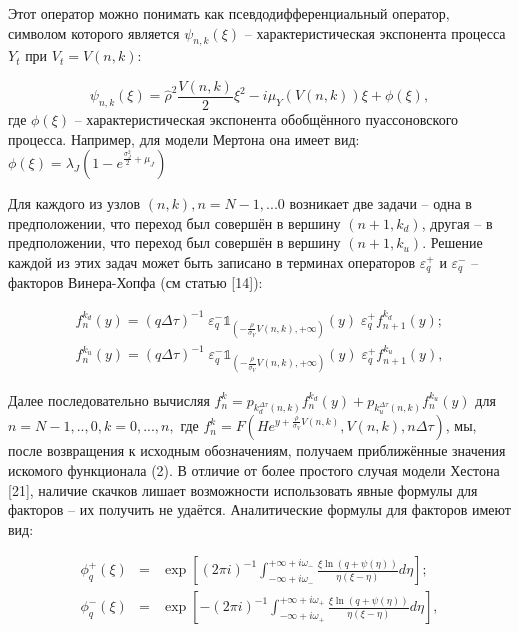 \documentclass[draft, 12pt]{article}
\begin{document}
Этот оператор можно понимать как псевдодифференциальный оператор, символом которого является $\psi_{n,k}(\xi)$ -- характеристическая экспонента процесса $Y_t$ при $V_t = V(n,k)$:

\begin{equation*}
	\psi_{n,k}(\xi) = \hat{\rho}^2\frac{V(n,k)}{2}\xi^2 - i\mu_Y(V(n,k))\xi + \phi(\xi),
\end{equation*}
где $\phi(\xi)$ -- характеристическая экспонента обобщённого пуассоновского процесса. Например, для модели Мертона она имеет вид: $\phi(\xi) = \lambda_J(1-e^{\frac{\sigma_J^2}{2} + \mu_J})$

Для каждого из узлов $(n,k), n=N-1,...0$ возникает две задачи -- одна в предположении, что переход был совершён в вершину $(n+1,k_d)$, другая -- в предположении, что переход был совершён в вершину $(n+1,k_u)$. Решение каждой из этих задач может быть записано в терминах операторов $\varepsilon^{+}_{q}$ и $\varepsilon^{-}_{q}$ -- факторов Винера-Хопфа (см статью [14]):

\begin{eqnarray*}
f_{n}^{k_{d}}(y) = (q{\Delta \tau})^{-1} \; \varepsilon^{-}_{q} \mathds{1}_{(- \frac{\rho}{\sigma_V}V(n,k), +\infty)}(y) \; \varepsilon^{+}_{q} f_{n+1}^{k_d}(y);\\
f_{n}^{k_{u}}(y) = (q{\Delta \tau})^{-1} \; \varepsilon^{-}_{q} \mathds{1}_{(- \frac{\rho}{\sigma_V}V(n,k), +\infty)}(y) \; \varepsilon^{+}_{q} f_{n+1}^{k_u}(y),
\end{eqnarray*}

Далее последовательно вычисляя $f_n^k = p_{k_d^{\Delta \tau}(n,k)} f_n^{k_d}(y) + p_{k_u^{\Delta \tau}(n,k)} f_n^{k_u}(y)$ для $n=N-1,..,0, k = 0,...,n,$
где $f_n^k = F(He^{y+\frac{\rho}{\sigma_V}V(n,k)}, V(n,k), n\Delta \tau)$, мы, после возвращения к исходным обозначениям, получаем приближённые значения искомого функционала (2). В отличие от более простого случая модели Хестона [21], наличие скачков лишает возможности использовать явные формулы для факторов -- их получить не удаётся. Аналитические формулы для факторов имеют вид:

\begin{eqnarray*}
	\phi^+_q(\xi)&=&\exp\left[(2\pi i)^{-1}
	\int_{-\infty+i\omega_-}^{+\infty+i\omega_-}\frac{\xi\ln(q+\psi(\eta))}
	{\eta(\xi-\eta)}d\eta\right];\\
	\phi^-_q(\xi)&=&\exp\left[-(2\pi i)^{-1}
	\int_{-\infty+i\omega_+}^{+\infty+i\omega_+}\frac{\xi\ln(q+\psi(\eta))}
	{\eta(\xi-\eta)}d\eta\right],
\end{eqnarray*}
\end{document}
